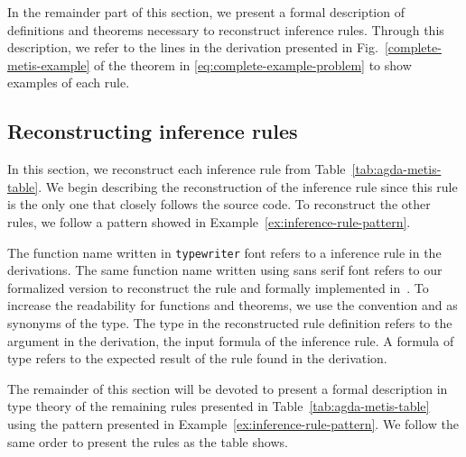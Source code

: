 \documentclass[../itp-2018.tex]{subfiles}
\begin{document}
In the remainder part of this section, we present a formal description of
definitions and theorems necessary to reconstruct \Metis inference rules.
Through this description, we refer to the lines in the \Metis derivation
presented in Fig.~\ref{complete-metis-example} of the theorem in
\eqref{eq:complete-example-problem} to show examples of each rule.


\subsection{Reconstructing \Metis inference rules}
\label{ssec:emulating-inferences}

In this section, we reconstruct each \Metis inference rule from
Table~\ref{tab:agda-metis-table}.
We begin describing the reconstruction of the \strip inference rule
since this rule  is the only one that closely follows the \Metis
source code. To reconstruct the other rules, we follow a pattern showed
in Example~\ref{ex:inference-rule-pattern}.

\begin{notation}

  The function name written in \texttt{typewriter} font refers to a \Metis
  inference rule in the \TSTP derivations. The same function name written using
  \textsf{sans serif} font refers to our formalized version to reconstruct the
  rule and formally implemented in~\cite{AgdaMetis}. To increase the readability
  for functions and theorems, we use the convention \Source and \Target as
  synonyms of the \Prop type. The \Source type in the reconstructed rule
  definition refers to the argument in the \TSTP derivation, \ie the input
  formula of the inference rule. A formula of \Target type refers to the
  expected result of the rule found in the \TSTP derivation.

\end{notation}



The remainder of this section will be devoted to present a formal description in
type theory of the remaining \Metis rules presented in
Table~\ref{tab:agda-metis-table} using the pattern presented in
Example~\ref{ex:inference-rule-pattern}. We follow the same order to present the
rules as the table shows.
\end{document}
